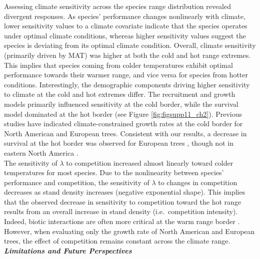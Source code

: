 Assessing climate sensitivity across the species range distribution
revealed divergent responses. As species' performance changes
nonlinearly with climate, lower sensitivity values to a climate
covariate indicate that the species operates under optimal climate
conditions, whereas higher sensitivity values suggest the species is
deviating from its optimal climate condition. Overall, climate
sensitivity (primarily driven by MAT) was higher at both the cold and
hot range extremes. This implies that species coming from colder
temperatures exhibit optimal performance towards their warmer range, and
vice versa for species from hotter conditions. Interestingly, the
demographic components driving higher sensitivity to climate at the cold
and hot extremes differ. The recruitment and growth models primarily
influenced sensitivity at the cold border, while the survival model
dominated at the hot border (see Figure \ref{fig:figsupp11_ch2}). Previous studies have
indicated climate-constrained growth rates at the cold border for North
American \citep{Ettinger2013} and European \citep{Kunstler2021} trees.
Consistent with our results, a decrease in survival at the hot border
was observed for European trees \citep{Kunstler2021}, though not in
eastern North America \citep{Purves2009}.\\

The sensitivity of \(\lambda\) to competition increased almost linearly
toward colder temperatures for most species. Due to the nonlinearity
between species' performance and competition, the sensitivity of
\(\lambda\) to changes in competition decreases as stand density
increases (negative exponential shape). This implies that the observed
decrease in sensitivity to competition toward the hot range results from
an overall increase in stand density (i.e.~competition intensity).
Indeed, biotic interactions are often more critical at the warm range
border \citep{Paquette2021}. However, when evaluating only the growth
rate of North American \citep{Ettinger2013} and European
\citep{Kunstler2011a} trees, the effect of competition remains constant
across the climate range.\\

\textbf{\emph{Limitations and Future Perspectives}}

